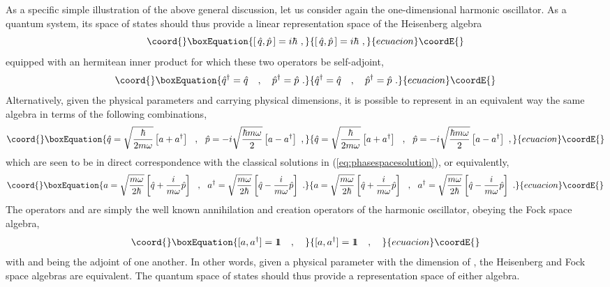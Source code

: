 \documentclass[a4paper,11pt]{article}
\def\one{1\hskip -.37em 1}
\begin{document}
As a specific simple illustration of the above general discussion,
let us consider again the one-dimensional harmonic oscillator.
As a quantum system, its space of states should thus provide a
linear representation space of the Heisenberg algebra
\begin{equation}\coord{}\boxEquation{[\,\hat{q},\hat{p}\,]=i\hbar\ ,
\label{eq:Heisenberg1.1}
}{[\,\hat{q},\hat{p}\,]=i\hbar\ ,
}{ecuacion}\coordE{}\end{equation}
equipped with an hermitean inner product for which these two operators
be self-adjoint,
\begin{equation}\coord{}\boxEquation{
\hat{q}^\dagger=\hat{q}\ \ \ ,\ \ \ 
\hat{p}^\dagger=\hat{p}\ .
\label{eq:Heisenberg1.2}
}{
\hat{q}^\dagger=\hat{q}\ \ \ ,\ \ \ 
\hat{p}^\dagger=\hat{p}\ .
}{ecuacion}\coordE{}\end{equation}
Alternatively, given the physical parameters \coordHE{} and \myHighlight{$\omega$}\coordHE{}
carrying physical dimensions,
it is possible to represent in an equivalent way the same algebra in
terms of the following combinations,
\begin{equation}\coord{}\boxEquation{
\hat{q}=\sqrt{\frac{\hbar}{2m\omega}}\left[a+a^\dagger\right]\ \ ,\ \ 
\hat{p}=-i\sqrt{\frac{\hbar m\omega}{2}}\left[a-a^\dagger\right]\ ,
}{
\hat{q}=\sqrt{\frac{\hbar}{2m\omega}}\left[a+a^\dagger\right]\ \ ,\ \ 
\hat{p}=-i\sqrt{\frac{\hbar m\omega}{2}}\left[a-a^\dagger\right]\ ,
}{ecuacion}\coordE{}\end{equation}
which are seen to be in direct correspondence with the classical
solutions in (\ref{eq:phasespacesolution}), or equivalently,
\begin{equation}\coord{}\boxEquation{
a=\sqrt{\frac{m\omega}{2\hbar}}\left[\hat{q}+\frac{i}{m\omega}\hat{p}\right]
\ \ ,\ \ 
a^\dagger=\sqrt{\frac{m\omega}{2\hbar}}\left[\hat{q}
-\frac{i}{m\omega}\hat{p}\right]\ .
\label{eq:definitionFock}
}{
a=\sqrt{\frac{m\omega}{2\hbar}}\left[\hat{q}+\frac{i}{m\omega}\hat{p}\right]
\ \ ,\ \ 
a^\dagger=\sqrt{\frac{m\omega}{2\hbar}}\left[\hat{q}
-\frac{i}{m\omega}\hat{p}\right]\ .
}{ecuacion}\coordE{}\end{equation}
The operators \coordHE{} and \coordHE{} are simply the
well known annihilation and creation operators of the harmonic
oscillator, obeying the Fock space algebra,
\begin{equation}\coord{}\boxEquation{
[a,a^\dagger]=\one\ \ \ ,\ \ \
\label{eq:Fock}
}{
[a,a^\dagger]=\one\ \ \ ,\ \ \
}{ecuacion}\coordE{}\end{equation}
with \myHighlight{$a$}\coordHE{} and \myHighlight{$a^\dagger$}\coordHE{} being the adjoint of one another.
In other words, given a physical parameter with the dimension
of \myHighlight{$m\omega$}\coordHE{}, the Heisenberg and Fock space algebras are equivalent.
The quantum space of states should thus provide a representation
space of either algebra.
\end{document}
